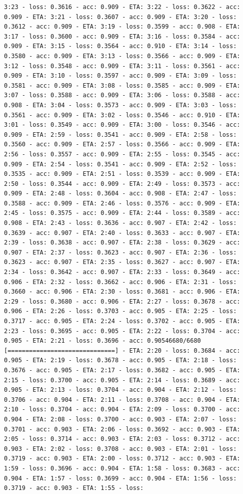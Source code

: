 \documentclass[11pt]{article}
\begin{document}
\begin{Verbatim}[commandchars=\\\{\}]
3:23 - loss: 0.3616 - acc: 0.909 - ETA: 3:22 - loss: 0.3622 - acc: 0.909 - ETA: 3:21 - loss: 0.3607 - acc: 0.909 - ETA: 3:20 - loss: 0.3612 - acc: 0.909 - ETA: 3:19 - loss: 0.3599 - acc: 0.908 - ETA: 3:17 - loss: 0.3600 - acc: 0.909 - ETA: 3:16 - loss: 0.3584 - acc: 0.909 - ETA: 3:15 - loss: 0.3564 - acc: 0.910 - ETA: 3:14 - loss: 0.3580 - acc: 0.909 - ETA: 3:13 - loss: 0.3566 - acc: 0.909 - ETA: 3:12 - loss: 0.3548 - acc: 0.909 - ETA: 3:11 - loss: 0.3561 - acc: 0.909 - ETA: 3:10 - loss: 0.3597 - acc: 0.909 - ETA: 3:09 - loss: 0.3581 - acc: 0.909 - ETA: 3:08 - loss: 0.3585 - acc: 0.909 - ETA: 3:07 - loss: 0.3588 - acc: 0.909 - ETA: 3:06 - loss: 0.3588 - acc: 0.908 - ETA: 3:04 - loss: 0.3573 - acc: 0.909 - ETA: 3:03 - loss: 0.3561 - acc: 0.909 - ETA: 3:02 - loss: 0.3546 - acc: 0.910 - ETA: 3:01 - loss: 0.3549 - acc: 0.909 - ETA: 3:00 - loss: 0.3546 - acc: 0.909 - ETA: 2:59 - loss: 0.3541 - acc: 0.909 - ETA: 2:58 - loss: 0.3560 - acc: 0.909 - ETA: 2:57 - loss: 0.3566 - acc: 0.909 - ETA: 2:56 - loss: 0.3557 - acc: 0.909 - ETA: 2:55 - loss: 0.3545 - acc: 0.909 - ETA: 2:54 - loss: 0.3541 - acc: 0.909 - ETA: 2:52 - loss: 0.3535 - acc: 0.909 - ETA: 2:51 - loss: 0.3539 - acc: 0.909 - ETA: 2:50 - loss: 0.3544 - acc: 0.909 - ETA: 2:49 - loss: 0.3573 - acc: 0.909 - ETA: 2:48 - loss: 0.3604 - acc: 0.908 - ETA: 2:47 - loss: 0.3588 - acc: 0.909 - ETA: 2:46 - loss: 0.3576 - acc: 0.909 - ETA: 2:45 - loss: 0.3575 - acc: 0.909 - ETA: 2:44 - loss: 0.3589 - acc: 0.908 - ETA: 2:43 - loss: 0.3636 - acc: 0.907 - ETA: 2:42 - loss: 0.3639 - acc: 0.907 - ETA: 2:40 - loss: 0.3633 - acc: 0.907 - ETA: 2:39 - loss: 0.3638 - acc: 0.907 - ETA: 2:38 - loss: 0.3629 - acc: 0.907 - ETA: 2:37 - loss: 0.3623 - acc: 0.907 - ETA: 2:36 - loss: 0.3623 - acc: 0.907 - ETA: 2:35 - loss: 0.3627 - acc: 0.907 - ETA: 2:34 - loss: 0.3642 - acc: 0.907 - ETA: 2:33 - loss: 0.3649 - acc: 0.906 - ETA: 2:32 - loss: 0.3662 - acc: 0.906 - ETA: 2:31 - loss: 0.3660 - acc: 0.906 - ETA: 2:30 - loss: 0.3681 - acc: 0.906 - ETA: 2:29 - loss: 0.3680 - acc: 0.906 - ETA: 2:27 - loss: 0.3678 - acc: 0.906 - ETA: 2:26 - loss: 0.3703 - acc: 0.905 - ETA: 2:25 - loss: 0.3717 - acc: 0.905 - ETA: 2:24 - loss: 0.3702 - acc: 0.905 - ETA: 2:23 - loss: 0.3695 - acc: 0.905 - ETA: 2:22 - loss: 0.3704 - acc: 0.905 - ETA: 2:21 - loss: 0.3696 - acc: 0.90546680/6680 [==============================] - ETA: 2:20 - loss: 0.3684 - acc: 0.905 - ETA: 2:19 - loss: 0.3678 - acc: 0.905 - ETA: 2:18 - loss: 0.3676 - acc: 0.905 - ETA: 2:17 - loss: 0.3682 - acc: 0.905 - ETA: 2:15 - loss: 0.3700 - acc: 0.905 - ETA: 2:14 - loss: 0.3689 - acc: 0.905 - ETA: 2:13 - loss: 0.3704 - acc: 0.904 - ETA: 2:12 - loss: 0.3706 - acc: 0.904 - ETA: 2:11 - loss: 0.3708 - acc: 0.904 - ETA: 2:10 - loss: 0.3704 - acc: 0.904 - ETA: 2:09 - loss: 0.3700 - acc: 0.904 - ETA: 2:08 - loss: 0.3700 - acc: 0.903 - ETA: 2:07 - loss: 0.3701 - acc: 0.903 - ETA: 2:06 - loss: 0.3692 - acc: 0.903 - ETA: 2:05 - loss: 0.3714 - acc: 0.903 - ETA: 2:03 - loss: 0.3712 - acc: 0.903 - ETA: 2:02 - loss: 0.3708 - acc: 0.903 - ETA: 2:01 - loss: 0.3719 - acc: 0.903 - ETA: 2:00 - loss: 0.3712 - acc: 0.903 - ETA: 1:59 - loss: 0.3696 - acc: 0.904 - ETA: 1:58 - loss: 0.3683 - acc: 0.904 - ETA: 1:57 - loss: 0.3699 - acc: 0.904 - ETA: 1:56 - loss: 0.3719 - acc: 0.903 - ETA: 1:55 - loss: 
\end{Verbatim}
\end{document}
